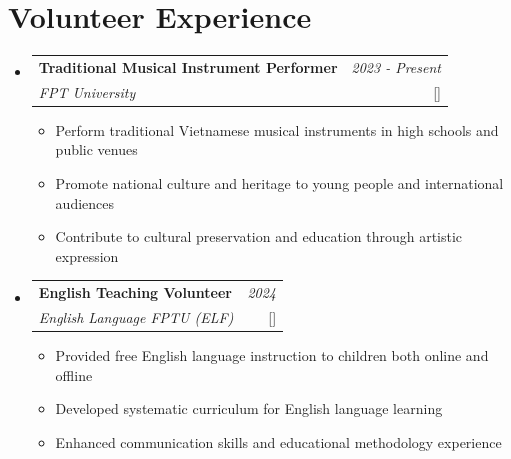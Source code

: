 \documentclass[a4paper,11pt]{article}
\makeatletter
\newcommand{\resumeProject}[4]{
\vspace{0.5mm}\item
    \begin{tabular*}{0.98\textwidth}[t]{l@{\extracolsep{\fill}}r}
        \textbf{#1} & \textit{\footnotesize{#3}} \\
        \footnotesize{\textit{#2}} & \footnotesize{#4}
    \end{tabular*}
    \vspace{-2.4mm}
}
\newcommand{\resumeSubHeadingListStart}{\begin{itemize}[leftmargin=*,labelsep=1mm]}
\newcommand{\resumeItemListStart}{\begin{itemize}[leftmargin=*,labelsep=1mm,itemsep=0.5mm]}
\newcommand{\resumeSubHeadingListEnd}{\end{itemize}\vspace{2mm}}
\newcommand{\resumeItemListEnd}{\end{itemize}\vspace{-2mm}}
\makeatother
\begin{document}

\vspace{-6mm}

\section{\textbf{Volunteer Experience}}
\vspace{-0.4mm}
\resumeSubHeadingListStart
\resumeProject
  {Traditional Musical Instrument Performer}
  {FPT University}
  {2023 - Present}
  {{}[\href{https://drive.google.com/file/d/1ZQlzeoQsbmro5iqdXolZSJ8BhEfgAzAL/view?usp=drive_link}{\textcolor{darkblue}{\faIcon{globe}}}]}
\resumeItemListStart
  \item Perform traditional Vietnamese musical instruments in high schools and public venues
  \item Promote national culture and heritage to young people and international audiences
  \item Contribute to cultural preservation and education through artistic expression
\resumeItemListEnd

\resumeProject
  {English Teaching Volunteer}
  {English Language FPTU (ELF)}
  {2024}
  {{}[\href{https://www.facebook.com/EnglishLanguage.FPTU}{\textcolor{darkblue}{\faIcon{globe}}}]}
\resumeItemListStart
  \item Provided free English language instruction to children both online and offline
  \item Developed systematic curriculum for English language learning
  \item Enhanced communication skills and educational methodology experience
\resumeItemListEnd

\resumeSubHeadingListEnd
\vspace{-6mm}
\end{document}
